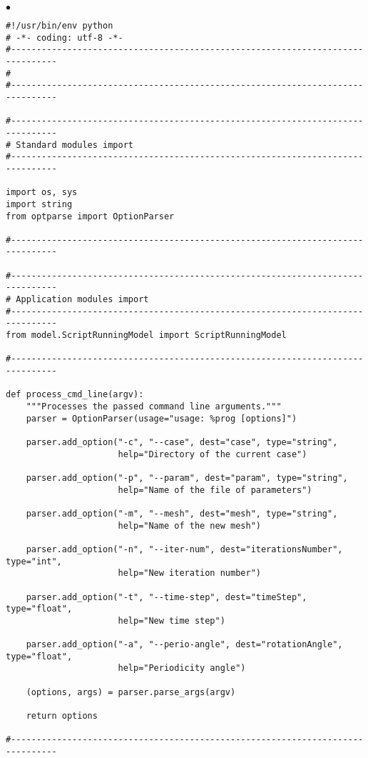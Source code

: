 \documentclass[a4paper,10pt,twoside]{csshortdoc}
\begin{document}
\begin{list}{$\bullet$}{}
\small
\begin{verbatim}
#!/usr/bin/env python
# -*- coding: utf-8 -*-
#-------------------------------------------------------------------------------
#
#-------------------------------------------------------------------------------

#-------------------------------------------------------------------------------
# Standard modules import
#-------------------------------------------------------------------------------

import os, sys
import string
from optparse import OptionParser

#-------------------------------------------------------------------------------

#-------------------------------------------------------------------------------
# Application modules import
#-------------------------------------------------------------------------------
from model.ScriptRunningModel import ScriptRunningModel

#-------------------------------------------------------------------------------

def process_cmd_line(argv):
    """Processes the passed command line arguments."""
    parser = OptionParser(usage="usage: %prog [options]")

    parser.add_option("-c", "--case", dest="case", type="string",
                      help="Directory of the current case")

    parser.add_option("-p", "--param", dest="param", type="string",
                      help="Name of the file of parameters")

    parser.add_option("-m", "--mesh", dest="mesh", type="string",
                      help="Name of the new mesh")

    parser.add_option("-n", "--iter-num", dest="iterationsNumber", type="int",
                      help="New iteration number")

    parser.add_option("-t", "--time-step", dest="timeStep", type="float",
                      help="New time step")

    parser.add_option("-a", "--perio-angle", dest="rotationAngle", type="float",
                      help="Periodicity angle")

    (options, args) = parser.parse_args(argv)

    return options

#-------------------------------------------------------------------------------


\end{verbatim}
\end{list}
\end{document}
